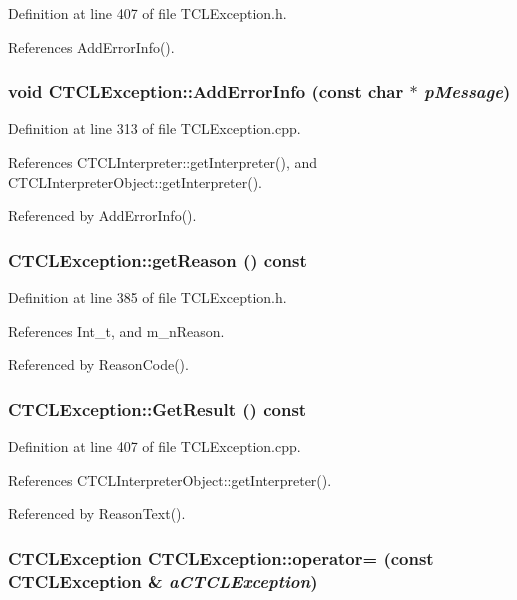 Definition at line 407 of file TCLException.h.

References Add\-Error\-Info().
\subsubsection{\setlength{\rightskip}{0pt plus 5cm}void CTCLException::Add\-Error\-Info (const char $\ast$ {\em p\-Message})}\label{classCTCLException_a7}




Definition at line 313 of file TCLException.cpp.

References CTCLInterpreter::get\-Interpreter(), and CTCLInterpreter\-Object::get\-Interpreter().

Referenced by Add\-Error\-Info().
\subsubsection{ CTCLException::get\-Reason () const\hspace{0.3cm}{\tt  [inline]}}\label{classCTCLException_a6}




Definition at line 385 of file TCLException.h.

References Int\_\-t, and m\_\-n\-Reason.

Referenced by Reason\-Code().
\subsubsection{ CTCLException::Get\-Result () const}\label{classCTCLException_a12}




Definition at line 407 of file TCLException.cpp.

References CTCLInterpreter\-Object::get\-Interpreter().

Referenced by Reason\-Text().
\subsubsection{\setlength{\rightskip}{0pt plus 5cm}CTCLException CTCLException::operator= (const CTCLException \& {\em a\-CTCLException})\hspace{0.3cm}{\tt  [inline]}}\label{classCTCLException_a4}





